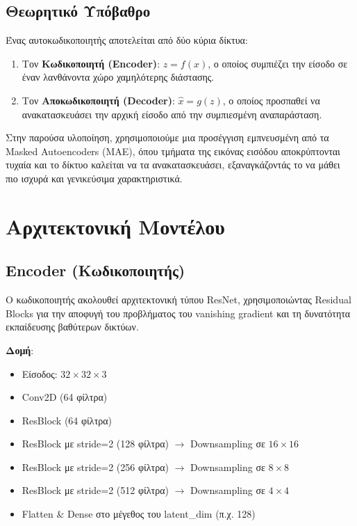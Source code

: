 \documentclass[11pt,a4paper]{article}
\begin{document}
\subsection{Θεωρητικό Υπόβαθρο}
Ένας αυτοκωδικοποιητής αποτελείται από δύο κύρια δίκτυα:
\begin{enumerate}
    \item Τον \textbf{Κωδικοποιητή (Encoder)}: $z = f(x)$, ο οποίος συμπιέζει την είσοδο σε έναν λανθάνοντα χώρο χαμηλότερης διάστασης.
    \item Τον \textbf{Αποκωδικοποιητή (Decoder)}: $\hat{x} = g(z)$, ο οποίος προσπαθεί να ανακατασκευάσει την αρχική είσοδο από την συμπιεσμένη αναπαράσταση.
\end{enumerate}

Στην παρούσα υλοποίηση, χρησιμοποιούμε μια προσέγγιση εμπνευσμένη από τα \textenglish{Masked Autoencoders (MAE)}, όπου τμήματα της εικόνας εισόδου αποκρύπτονται τυχαία και το δίκτυο καλείται να τα ανακατασκευάσει, εξαναγκάζοντάς το να μάθει πιο ισχυρά και γενικεύσιμα χαρακτηριστικά.

\newpage

\section{Αρχιτεκτονική Μοντέλου}

\subsection{Encoder (Κωδικοποιητής)}
Ο κωδικοποιητής ακολουθεί αρχιτεκτονική τύπου \textenglish{ResNet}, χρησιμοποιώντας \textenglish{Residual Blocks} για την αποφυγή του προβλήματος του \textenglish{vanishing gradient} και τη δυνατότητα εκπαίδευσης βαθύτερων δικτύων.

\textbf{Δομή}:
\begin{itemize}
    \item Είσοδος: $32 \times 32 \times 3$
    \item \textenglish{Conv2D} (64 φίλτρα)
    \item \textenglish{ResBlock} (64 φίλτρα)
    \item \textenglish{ResBlock} με \textenglish{stride=2} (128 φίλτρα) $\rightarrow$ Downsampling σε $16 \times 16$
    \item \textenglish{ResBlock} με \textenglish{stride=2} (256 φίλτρα) $\rightarrow$ Downsampling σε $8 \times 8$
    \item \textenglish{ResBlock} με \textenglish{stride=2} (512 φίλτρα) $\rightarrow$ Downsampling σε $4 \times 4$
    \item \textenglish{Flatten} \& \textenglish{Dense} στο μέγεθος του \textenglish{latent\_dim} (π.χ. 128)
\end{itemize}
\end{document}
